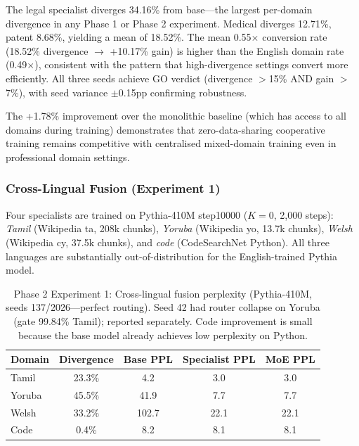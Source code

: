 \documentclass{article}
\begin{document}
The legal specialist diverges 34.16\% from base---the largest per-domain divergence in any Phase 1 or Phase 2 experiment. Medical diverges 12.71\%, patent 8.68\%, yielding a mean of 18.52\%. The mean 0.55$\times$ conversion rate (18.52\% divergence $\to$ +10.17\% gain) is higher than the English domain rate (0.49$\times$), consistent with the pattern that high-divergence settings convert more efficiently. All three seeds achieve GO verdict (divergence $>$15\% AND gain $>$7\%), with seed variance $\pm$0.15pp confirming robustness.

The +1.78\% improvement over the monolithic baseline (which has access to all domains during training) demonstrates that zero-data-sharing cooperative training remains competitive with centralised mixed-domain training even in professional domain settings.

\subsubsection{Cross-Lingual Fusion (Experiment 1)}
\label{sec:phase2_crosslingual}

Four specialists are trained on Pythia-410M step10000 ($K=0$, 2,000 steps): \emph{Tamil} (Wikipedia ta, 208k chunks), \emph{Yoruba} (Wikipedia yo, 13.7k chunks), \emph{Welsh} (Wikipedia cy, 37.5k chunks), and \emph{code} (CodeSearchNet Python). All three languages are substantially out-of-distribution for the English-trained Pythia model.

\begin{table}[h]
\centering
\caption{Phase 2 Experiment 1: Cross-lingual fusion perplexity (Pythia-410M, seeds 137/2026---perfect routing). Seed 42 had router collapse on Yoruba (gate 99.84\% Tamil); reported separately. Code improvement is small because the base model already achieves low perplexity on Python.}
\label{tab:phase2_crosslingual}
\begin{tabular}{lcccc}
\toprule
\textbf{Domain} & \textbf{Divergence} & \textbf{Base PPL} & \textbf{Specialist PPL} & \textbf{MoE PPL} \\
\midrule
Tamil  & 23.3\% & 4.2  & 3.0  & 3.0  \\
Yoruba & 45.5\% & 41.9 & 7.7  & 7.7  \\
Welsh  & 33.2\% & 102.7 & 22.1 & 22.1 \\
Code   & 0.4\%  & 8.2  & 8.1  & 8.1  \\
\bottomrule
\end{tabular}
\end{table}
\end{document}
